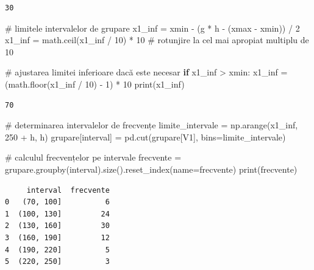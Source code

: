 \documentclass[
  11pt,
  b5paper,
  nottoc]{book}
\newenvironment{Shaded}{\begin{snugshade}}{\end{snugshade}}
\newcommand{\BuiltInTok}[1]{\textcolor[rgb]{0.00,0.23,0.31}{#1}}
\newcommand{\CommentTok}[1]{\textcolor[rgb]{0.37,0.37,0.37}{#1}}
\newcommand{\ControlFlowTok}[1]{\textcolor[rgb]{0.00,0.23,0.31}{\textbf{#1}}}
\newcommand{\DecValTok}[1]{\textcolor[rgb]{0.68,0.00,0.00}{#1}}
\newcommand{\NormalTok}[1]{\textcolor[rgb]{0.00,0.23,0.31}{#1}}
\newcommand{\OperatorTok}[1]{\textcolor[rgb]{0.37,0.37,0.37}{#1}}
\newcommand{\StringTok}[1]{\textcolor[rgb]{0.13,0.47,0.30}{#1}}
\begin{document}
\begin{verbatim}
30
\end{verbatim}

\begin{Shaded}
\begin{Highlighting}[]
\CommentTok{\# limitele intervalelor de grupare}
\NormalTok{x1\_inf }\OperatorTok{=}\NormalTok{ xmin }\OperatorTok{{-}}\NormalTok{ (g }\OperatorTok{*}\NormalTok{ h }\OperatorTok{{-}}\NormalTok{ (xmax }\OperatorTok{{-}}\NormalTok{ xmin)) }\OperatorTok{/} \DecValTok{2}
\NormalTok{x1\_inf }\OperatorTok{=}\NormalTok{ math.ceil(x1\_inf }\OperatorTok{/} \DecValTok{10}\NormalTok{) }\OperatorTok{*} \DecValTok{10}  \CommentTok{\# rotunjire la cel mai apropiat multiplu de 10}

\CommentTok{\# ajustarea limitei inferioare dacă este necesar}
\ControlFlowTok{if}\NormalTok{ x1\_inf }\OperatorTok{\textgreater{}}\NormalTok{ xmin:}
\NormalTok{    x1\_inf }\OperatorTok{=}\NormalTok{ (math.floor(x1\_inf }\OperatorTok{/} \DecValTok{10}\NormalTok{) }\OperatorTok{{-}} \DecValTok{1}\NormalTok{) }\OperatorTok{*} \DecValTok{10}
\BuiltInTok{print}\NormalTok{(x1\_inf)}
\end{Highlighting}
\end{Shaded}

\begin{verbatim}
70
\end{verbatim}

\begin{Shaded}
\begin{Highlighting}[]
\CommentTok{\# determinarea intervalelor de frecvențe}
\NormalTok{limite\_intervale }\OperatorTok{=}\NormalTok{ np.arange(x1\_inf, }\DecValTok{250} \OperatorTok{+}\NormalTok{ h, h)}
\NormalTok{grupare[}\StringTok{\textquotesingle{}interval\textquotesingle{}}\NormalTok{] }\OperatorTok{=}\NormalTok{ pd.cut(grupare[}\StringTok{\textquotesingle{}V1\textquotesingle{}}\NormalTok{], bins}\OperatorTok{=}\NormalTok{limite\_intervale)}

\CommentTok{\# calculul frecvențelor pe intervale}
\NormalTok{frecvente }\OperatorTok{=}\NormalTok{ grupare.groupby(}\StringTok{\textquotesingle{}interval\textquotesingle{}}\NormalTok{).size().reset\_index(name}\OperatorTok{=}\StringTok{\textquotesingle{}frecvente\textquotesingle{}}\NormalTok{)}
\BuiltInTok{print}\NormalTok{(frecvente)}
\end{Highlighting}
\end{Shaded}

\begin{verbatim}
     interval  frecvente
0   (70, 100]          6
1  (100, 130]         24
2  (130, 160]         30
3  (160, 190]         12
4  (190, 220]          5
5  (220, 250]          3
\end{verbatim}
\end{document}
